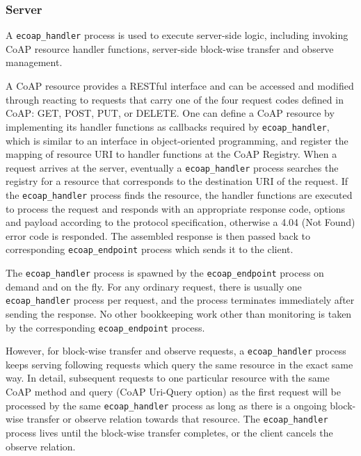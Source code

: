 \subsubsection{Server}

A \verb|ecoap_handler| process is used to execute server-side logic, including invoking CoAP resource handler functions, server-side block-wise transfer and observe management. 

A CoAP resource provides a RESTful interface and can be accessed and modified through reacting to requests that carry one of the four request codes defined in CoAP: GET, POST, PUT, or DELETE. One can define a CoAP resource by implementing its handler functions as callbacks required by \verb|ecoap_handler|, which is similar to an interface in object-oriented programming, and register the mapping of resource URI to handler functions at the CoAP Registry. When a request arrives at the server, eventually a \verb|ecoap_handler| process searches the registry for a resource that corresponds to the destination URI of the request. If the \verb|ecoap_handler| process finds the resource, the handler functions are executed to process the request and responds with an appropriate response code, options and payload according to the protocol specification, otherwise a 4.04 (Not Found) error code is responded. The assembled response is then passed back to corresponding \verb|ecoap_endpoint| process which sends it to the client. 

The \verb|ecoap_handler| process is spawned by the \verb|ecoap_endpoint| process on demand and on the fly. For any ordinary request, there is usually one \verb|ecoap_handler| process per request, and the process terminates immediately after sending the response.
No other bookkeeping work other than monitoring is taken by the corresponding \verb|ecoap_endpoint| process. 

However, for block-wise transfer and observe requests, a \verb|ecoap_handler| process keeps serving following requests which query the same resource in the exact same way. In detail, subsequent requests to one particular resource with the same CoAP method and query (CoAP Uri-Query option) as the first request will be processed by the same \verb|ecoap_handler| process as long as there is a ongoing block-wise transfer or observe relation towards that resource. The \verb|ecoap_handler| process lives until the block-wise transfer completes, or the client cancels the observe relation. 

